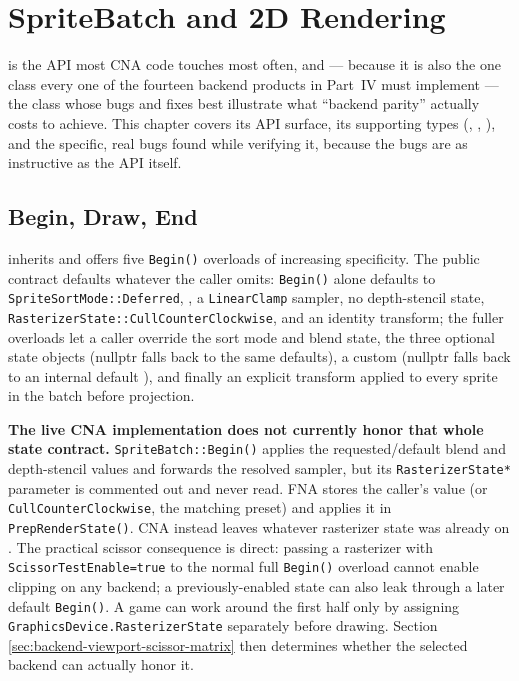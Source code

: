 \chapter{SpriteBatch and 2D Rendering}
\label{ch:spritebatch}

 is the API most CNA code touches most often, and --- because it is
also the one class every one of the fourteen backend products in Part~IV must implement --- the class
whose bugs and fixes best illustrate what ``backend parity'' actually costs to achieve. This
chapter covers its API surface, its supporting types (,
, ), and the specific, real bugs found while
verifying it, because the bugs are as instructive as the API itself.

\section{Begin, Draw, End}

 inherits  and offers five \texttt{Begin()}
overloads of increasing specificity. The public contract defaults whatever the caller omits:
\texttt{Begin()} alone defaults to \texttt{SpriteSortMode::Deferred},
, a \texttt{LinearClamp} sampler, no depth-stencil state,
\texttt{RasterizerState::\allowbreak{}CullCounterClockwise}, and an identity transform; the fuller
overloads let a caller override the sort mode and blend state, the three optional state
objects (nullptr falls back to the same defaults), a custom  (nullptr falls
back to an internal default ), and finally an explicit transform
 applied to every sprite in the batch before projection.

\begin{sourcenote}
\textbf{The live CNA implementation does not currently honor that whole state contract.}
\texttt{SpriteBatch::Begin()} applies the requested/default blend and depth-stencil values and
forwards the resolved sampler, but its \texttt{RasterizerState*} parameter is commented out and
never read. FNA stores the caller's value (or
\texttt{CullCounterClockwise}, the matching  preset) and applies it in
\texttt{PrepRenderState()}. CNA instead leaves whatever rasterizer state was already on
. The practical scissor consequence is direct: passing a rasterizer
with \texttt{ScissorTestEnable=true} to the normal full \texttt{Begin()} overload cannot enable
clipping on any backend; a previously-enabled state can also leak through a later default
\texttt{Begin()}. A game can work around the first half only by assigning
\texttt{GraphicsDevice.RasterizerState} separately before drawing. Section
\ref{sec:backend-viewport-scissor-matrix} then determines whether the selected backend can
actually honor it.
\end{sourcenote}

